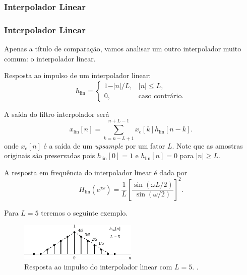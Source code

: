 \subsubsection{Interpolador Linear}
\begin{frame}[allowframebreaks]
  \frametitle{Interpolador Linear}

  Apenas a título de comparação, vamos analisar um outro interpolador muito comum: o interpolador linear.
  
  Resposta ao impulso de um interpolador linear:
  \begin{equation}
    h_{\text{lin}} = \begin{cases}
         1 - \vert n \vert / L, & \vert n \vert \leq L , \\
         0, &\text{caso contrário.}
                    \end{cases}
  \end{equation}

  A saída do filtro interpolador será
  \begin{equation}
   x_{\text{lin}} [n] = \sum_{k=n-L+1}^{n+L-1} x_e[k] h_{\text{lin}}[n-k] .
  \end{equation}
  onde $x_e[n]$ é a saída de um \textit{upsample} por um fator $L$.
  Note que as amostras originais são preservadas pois $h_{\text{lin}}[0] = 1$
  e $h_{\text{lin}}[n]=0$ para $|n| \geq L$.

  A resposta em frequência do interpolador linear é dada por
  \begin{equation}
   H_{\text{lin}} (e^{j\omega}) = \frac{1}{L} \left[ \frac{\sin (\omega L/2)}{\sin (\omega /2)} \right]^2 .
  \end{equation}


  \framebreak

  Para $L=5$ teremos o seguinte exemplo.
        \begin{figure}[h!]
        \centering
        \includegraphics[width=0.5\textwidth]{images/fig425.pdf}
        \caption{Resposta ao impulso do interpolador linear com $L=5$. \citep{oppenheim}.}
        \label{fig:fig425}
        \end{figure}


\end{frame}
